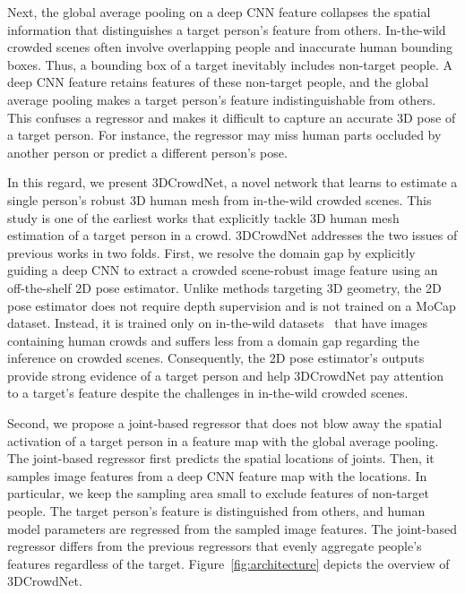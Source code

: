 \documentclass[10pt,twocolumn,letterpaper]{article}
\begin{document}
Next, the global average pooling on a deep CNN feature collapses the spatial information that distinguishes a target person's feature from others.
In-the-wild crowded scenes often involve overlapping people and inaccurate human bounding boxes.
Thus, a bounding box of a target inevitably includes non-target people.
A deep CNN feature retains features of these non-target people, and the global average pooling makes a target person’s feature indistinguishable from others.
This confuses a regressor and makes it difficult to capture an accurate 3D pose of a target person.
For instance, the regressor may miss human parts occluded by another person or predict a different person's pose.


In this regard, we present 3DCrowdNet, a novel network that learns to estimate a single person's robust 3D human mesh from in-the-wild crowded scenes.
This study is one of the earliest works that explicitly tackle 3D human mesh estimation of a target person in a crowd.
3DCrowdNet addresses the two issues of previous works in two folds.
First, we resolve the domain gap by explicitly guiding a deep CNN to extract a crowded scene-robust image feature using an off-the-shelf 2D pose estimator.
Unlike methods targeting 3D geometry, the 2D pose estimator does not require depth supervision and is not trained on a MoCap dataset.
Instead, it is trained only on in-the-wild datasets~\cite{li2019crowdpose,qiu2020peeking} that have images containing human crowds and suffers less from a domain gap regarding the inference on crowded scenes.
Consequently, the 2D pose estimator's outputs provide strong evidence of a target person and help 3DCrowdNet pay attention to a target's feature despite the challenges in in-the-wild crowded scenes.


Second, we propose a joint-based regressor that does not blow away the spatial activation of a target person in a feature map with the global average pooling.
The joint-based regressor first predicts the spatial locations of joints. 
Then, it samples image features from a deep CNN feature map with the locations.
In particular, we keep the sampling area small to exclude features of non-target people.
The target person's feature is distinguished from others, and human model parameters are regressed from the sampled image features.
The joint-based regressor differs from the previous regressors that evenly aggregate people's features regardless of the target.
Figure~\ref{fig:architecture} depicts the overview of 3DCrowdNet.
\end{document}
